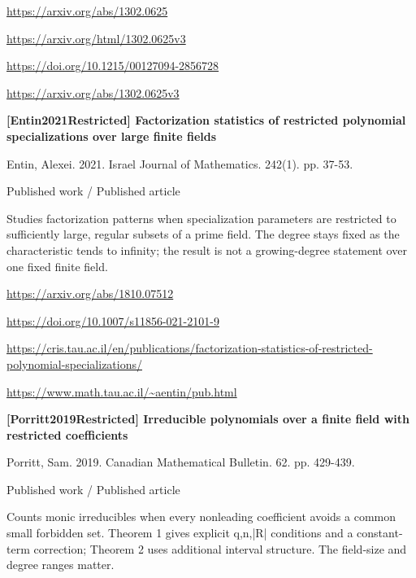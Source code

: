 \documentclass[11pt,a4paper,oneside,openany]{book}
\begin{document}
{\footnotesize\url{https://arxiv.org/abs/1302.0625}}\par
{\footnotesize\url{https://arxiv.org/html/1302.0625v3}}\par
{\footnotesize\url{https://doi.org/10.1215/00127094-2856728}}\par
{\footnotesize\url{https://arxiv.org/abs/1302.0625v3}}\par
\vspace{9pt}
\hypertarget{ref:Entin2021Restricted}{}
{\sffamily\bfseries\color{atlasgreen}[Entin2021Restricted] Factorization statistics of restricted polynomial specializations over large finite fields}\par
\color{black} Entin, Alexei. 2021. Israel Journal of Mathematics. 242(1). pp. 37-53.\par
{\small\sffamily\color{atlasgold}Published work / Published article}\par
\color{black} Studies factorization patterns when specialization parameters are restricted to sufficiently large, regular subsets of a prime field. The degree stays fixed as the characteristic tends to infinity; the result is not a growing-degree statement over one fixed finite field.\par
{\footnotesize\url{https://arxiv.org/abs/1810.07512}}\par
{\footnotesize\url{https://doi.org/10.1007/s11856-021-2101-9}}\par
{\footnotesize\url{https://cris.tau.ac.il/en/publications/factorization-statistics-of-restricted-polynomial-specializations/}}\par
{\footnotesize\url{https://www.math.tau.ac.il/~aentin/pub.html}}\par
\vspace{9pt}
\hypertarget{ref:Porritt2019Restricted}{}
{\sffamily\bfseries\color{atlasgreen}[Porritt2019Restricted] Irreducible polynomials over a finite field with restricted coefficients}\par
\color{black} Porritt, Sam. 2019. Canadian Mathematical Bulletin. 62. pp. 429-439.\par
{\small\sffamily\color{atlasgold}Published work / Published article}\par
\color{black} Counts monic irreducibles when every nonleading coefficient avoids a common small forbidden set. Theorem 1 gives explicit q,n,|R| conditions and a constant-term correction; Theorem 2 uses additional interval structure. The field-size and degree ranges matter.\par
\end{document}
